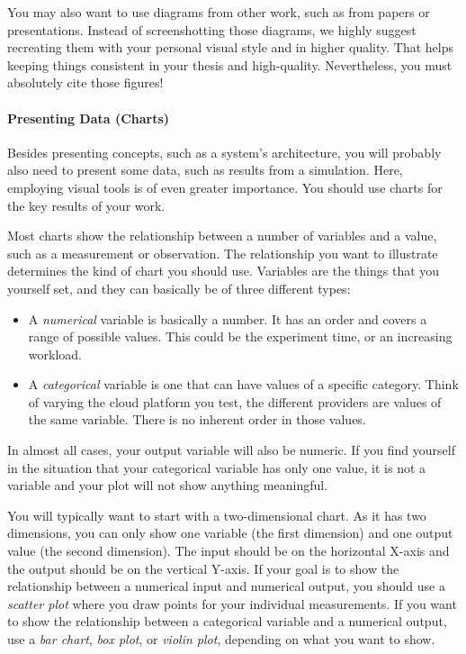 \documentclass[a4paper]{article}
\begin{document}
You may also want to use diagrams from other work, such as from papers or presentations.
Instead of screenshotting those diagrams, we highly suggest recreating them with your personal visual style and in higher quality.
That helps keeping things consistent in your thesis and high-quality.
Nevertheless, you must absolutely cite those figures!

\paragraph{Presenting Data (Charts)}

Besides presenting concepts, such as a system's architecture, you will probably also need to present some data, such as results from a simulation.
Here, employing visual tools is of even greater importance.
You should use charts for the key results of your work.

Most charts show the relationship between a number of variables and a value, such as a measurement or observation.
The relationship you want to illustrate determines the kind of chart you should use.
Variables are the things that you yourself set, and they can basically be of three different types:

\begin{itemize}
    \item A \emph{numerical} variable is basically a number. It has an order and covers a range of possible values. This could be the experiment time, or an increasing workload.
    \item A \emph{categorical} variable is one that can have values of a specific category. Think of varying the cloud platform you test, the different providers are values of the same variable. There is no inherent order in those values.
\end{itemize}

In almost all cases, your output variable will also be numeric.
If you find yourself in the situation that your categorical variable has only one value, it is not a variable and your plot will not show anything meaningful.

You will typically want to start with a two-dimensional chart.
As it has two dimensions, you can only show one variable (the first dimension) and one output value (the second dimension).
The input should be on the horizontal X-axis and the output should be on the vertical Y-axis.
If your goal is to show the relationship between a numerical input and numerical output, you should use a \emph{scatter plot} where you draw points for your individual measurements.
If you want to show the relationship between a categorical variable and a numerical output, use a \emph{bar chart}, \emph{box plot}, or \emph{violin plot}, depending on what you want to show.
\end{document}
